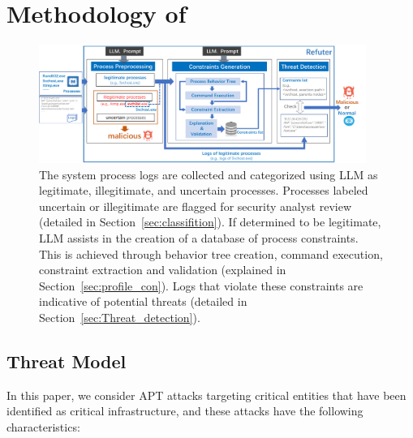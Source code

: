 \section{Methodology of \tool}

\begin{figure}[ht]
    \centering
      \includegraphics[width=0.95\textwidth]{figs/overview.pdf}
    \caption{The system process logs are collected and categorized using LLM as legitimate, illegitimate, and uncertain processes. Processes labeled uncertain or illegitimate are flagged for security analyst review (detailed in Section~\ref{sec:classifition}). If determined to be legitimate, LLM assists in the creation of a database of process constraints. This is achieved through behavior tree creation, command execution, constraint extraction and validation (explained in Section~\ref{sec:profile_con}). Logs that violate these constraints are indicative of potential threats (detailed in Section~\ref{sec:Threat_detection}).}
    \label{fig-framework}
    \end{figure}

\subsection{Threat Model}\label{sec:threatModel}
In this paper, we consider APT attacks targeting critical entities that have been identified as critical infrastructure, and these attacks have the following characteristics:

